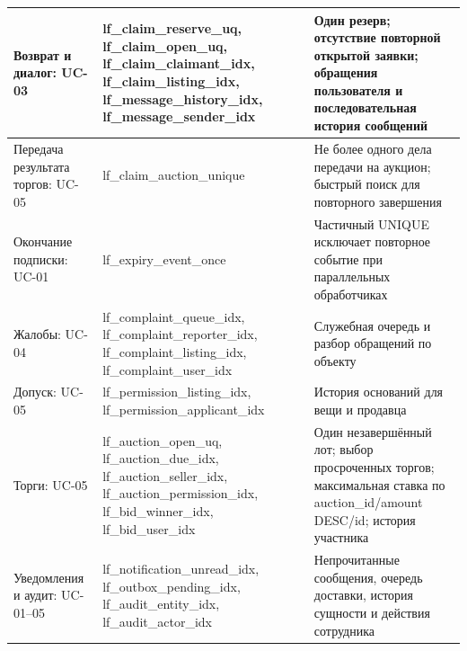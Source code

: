 \begin{longtable}{|>{\RaggedRight\arraybackslash}p{0.30\tablecontentwidth}|>{\RaggedRight\arraybackslash}p{0.35\tablecontentwidth}|>{\RaggedRight\arraybackslash}p{0.35\tablecontentwidth}|}
Возврат и диалог: UC-03 & lf\_\allowbreak{}claim\_\allowbreak{}reserve\_\allowbreak{}uq, lf\_\allowbreak{}claim\_\allowbreak{}open\_\allowbreak{}uq, lf\_\allowbreak{}claim\_\allowbreak{}claimant\_\allowbreak{}idx, lf\_\allowbreak{}claim\_\allowbreak{}listing\_\allowbreak{}idx, lf\_\allowbreak{}message\_\allowbreak{}history\_\allowbreak{}idx, lf\_\allowbreak{}message\_\allowbreak{}sender\_\allowbreak{}idx & Один резерв; отсутствие повторной открытой заявки; обращения пользователя и последовательная история сообщений \\ \hline
Передача результата торгов: UC-05 & lf\_\allowbreak{}claim\_\allowbreak{}auction\_\allowbreak{}unique & Не более одного дела передачи на аукцион; быстрый поиск для повторного завершения \\ \hline
Окончание подписки: UC-01 & lf\_\allowbreak{}expiry\_\allowbreak{}event\_\allowbreak{}once & Частичный UNIQUE исключает повторное событие при параллельных обработчиках \\ \hline
Жалобы: UC-04 & lf\_\allowbreak{}complaint\_\allowbreak{}queue\_\allowbreak{}idx, lf\_\allowbreak{}complaint\_\allowbreak{}reporter\_\allowbreak{}idx, lf\_\allowbreak{}complaint\_\allowbreak{}listing\_\allowbreak{}idx, lf\_\allowbreak{}complaint\_\allowbreak{}user\_\allowbreak{}idx & Служебная очередь и разбор обращений по объекту \\ \hline
Допуск: UC-05 & lf\_\allowbreak{}permission\_\allowbreak{}listing\_\allowbreak{}idx, lf\_\allowbreak{}permission\_\allowbreak{}applicant\_\allowbreak{}idx & История оснований для вещи и продавца \\ \hline
Торги: UC-05 & lf\_\allowbreak{}auction\_\allowbreak{}open\_\allowbreak{}uq, lf\_\allowbreak{}auction\_\allowbreak{}due\_\allowbreak{}idx, lf\_\allowbreak{}auction\_\allowbreak{}seller\_\allowbreak{}idx, lf\_\allowbreak{}auction\_\allowbreak{}permission\_\allowbreak{}idx, lf\_\allowbreak{}bid\_\allowbreak{}winner\_\allowbreak{}idx, lf\_\allowbreak{}bid\_\allowbreak{}user\_\allowbreak{}idx & Один незавершённый лот; выбор просроченных торгов; максимальная ставка по auction\_\allowbreak{}id/\allowbreak{}amount DESC/\allowbreak{}id; история участника \\ \hline
Уведомления и аудит: UC-01–05 & lf\_\allowbreak{}notification\_\allowbreak{}unread\_\allowbreak{}idx, lf\_\allowbreak{}outbox\_\allowbreak{}pending\_\allowbreak{}idx, lf\_\allowbreak{}audit\_\allowbreak{}entity\_\allowbreak{}idx, lf\_\allowbreak{}audit\_\allowbreak{}actor\_\allowbreak{}idx & Непрочитанные сообщения, очередь доставки, история сущности и действия сотрудника \\ \hline
\end{longtable}
\endgroup

